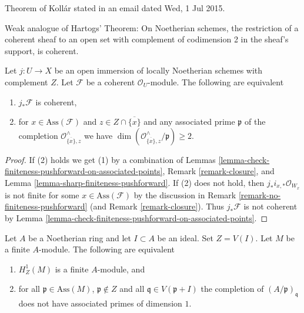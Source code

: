 \begin{proposition}[Koll\'ar]
\label{proposition-kollar}
\begin{reference}
Theorem of Koll\'ar stated in an email dated Wed, 1 Jul 2015.
\end{reference}
\begin{slogan}
Weak analogue of Hartogs' Theorem: On Noetherian schemes, the
restriction of a coherent sheaf to an open set with complement
of codimension 2 in the sheaf's support, is coherent.
\end{slogan}
Let $j : U \to X$ be an open immersion of locally Noetherian schemes
with complement $Z$. Let $\mathcal{F}$ be a coherent $\mathcal{O}_U$-module.
The following are equivalent
\begin{enumerate}
\item $j_*\mathcal{F}$ is coherent,
\item for $x \in \text{Ass}(\mathcal{F})$ and
$z \in Z \cap \overline{\{x\}}$ and any associated prime
$\mathfrak p$ of the completion $\mathcal{O}_{\overline{\{x\}}, z}^\wedge$
we have $\dim(\mathcal{O}_{\overline{\{x\}}, z}^\wedge/\mathfrak p) \geq 2$.
\end{enumerate}
\end{proposition}

\begin{proof}
If (2) holds we get (1) by a combination of
Lemmas \ref{lemma-check-finiteness-pushforward-on-associated-points},
Remark \ref{remark-closure}, and
Lemma \ref{lemma-sharp-finiteness-pushforward}.
If (2) does not hold, then $j_*i_{x, *}\mathcal{O}_{W_x}$ is not finite
for some $x \in \text{Ass}(\mathcal{F})$ by the discussion in
Remark \ref{remark-no-finiteness-pushforward}
(and Remark \ref{remark-closure}).
Thus $j_*\mathcal{F}$ is not coherent by
Lemma \ref{lemma-check-finiteness-pushforward-on-associated-points}.
\end{proof}

\begin{lemma}
\label{lemma-kollar-finiteness-H1-local}
Let $A$ be a Noetherian ring and let $I \subset A$ be an ideal.
Set $Z = V(I)$. Let $M$ be a finite $A$-module. The following
are equivalent
\begin{enumerate}
\item $H^1_Z(M)$ is a finite $A$-module, and
\item for all $\mathfrak p \in \text{Ass}(M)$, $\mathfrak p \not \in Z$
and all $\mathfrak q \in V(\mathfrak p + I)$ the completion of
$(A/\mathfrak p)_\mathfrak q$ does not have associated primes
of dimension $1$.
\end{enumerate}
\end{lemma}

